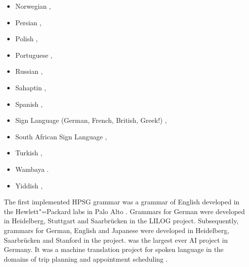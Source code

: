 \begin{itemize}
\item Norwegian \citep{HH2004a-u,BH2004a-u,HB2006a-u}, 
\item Persian \citep{MuellerPersian,MG2010a},
\item Polish \citep*{PKMM2002a-u,MMPK2003a-u}, %
\item Portuguese \citep{BC2008a-u,BC2008b-single-quotes,CB2010a-u},
\item Russian \citep{AZ2009a-u}, %
\item Sahaptin \citep{Drellishak2009a-u}, %
\item Spanish
  \citep*{PinedaMeza2005-u,PinedaMeza2005b-u,Bildhauer2008a,Marimon2013a-u%
}, 
\item Sign Language (German, French, British, Greek!) \citep{SM2002a-u,MS2004a-u,SG2010a-u},
\item South African Sign Language \citep{Bungeroth2002a-u},
\item Turkish \citep*{FPB09a-u},
\item Wambaya \citep{Bender2008b-u,Bender2008a,Bender2010a-u}.
\item Yiddish \citep{MOe2011a},
\end{itemize}
The first implemented HPSG grammar was a grammar of English developed in the Hewlett"=Packard labs in Palo Alto
\citep*{FPW85a,Flickinger87}. Grammars for German were developed in Heidelberg, Stuttgart and
Saarbrücken in the LILOG project. Subsequently, grammars for German, English and Japanese were
developed in Heidelberg, Saarbrücken and Stanford in the \verbmobil project. \verbmobil was the
largest ever AI project in Germany. It was a machine translation project for spoken language in the
domains of trip planning and appointment scheduling \citep{Wahlster2000a-ed-not-crossreferenced}.

